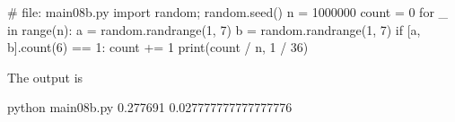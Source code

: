 \begin{console}[frame=single,fontsize=\footnotesize]
# file: main08b.py
import random; random.seed()
n = 1000000
count = 0
for _ in range(n):
    a = random.randrange(1, 7)
    b = random.randrange(1, 7)
    if [a, b].count(6) == 1:
        count += 1
print(count / n, 1 / 36)
\end{console}
The output is
\begin{console} python main08b.py
0.277691 0.027777777777777776
\end{console}

